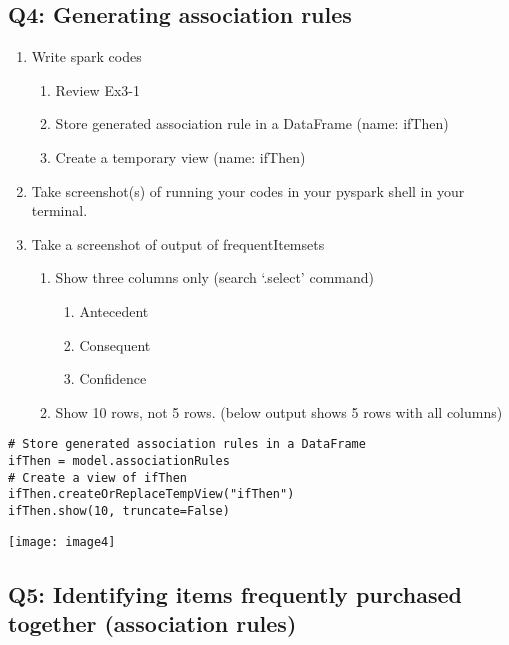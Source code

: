 \documentclass[]{article}
\begin{document}
\subsection*{Q4: Generating association rules}
\begin{enumerate}[before=\itshape,label=\arabic*.]
	\item Write spark codes
	\begin{enumerate}[before=\itshape,label=\alph*.]
		\item Review Ex3-1
		\item Store generated association rule in a DataFrame (name: ifThen)
		\item Create a temporary view (name: ifThen)
	\end{enumerate}
	\item Take screenshot(s) of running your codes in your pyspark shell in your terminal.
	\item Take a screenshot of output of frequentItemsets
	\begin{enumerate}[before=\itshape,label=\alph*.]
		\item Show three columns only (search ‘.select’ command)
		\begin{enumerate}[before=\itshape,label=\roman*.]
			\item Antecedent
			\item Consequent
			\item Confidence
		\end{enumerate}
		\item Show 10 rows, not 5 rows. (below output shows 5 rows with all columns)
	\end{enumerate}
\end{enumerate} 

\begin{verbatim}
# Store generated association rules in a DataFrame
ifThen = model.associationRules
# Create a view of ifThen
ifThen.createOrReplaceTempView("ifThen")
ifThen.show(10, truncate=False)
\end{verbatim}
\texttt{[image: image4]}

\subsection*{Q5: Identifying items frequently purchased together (association rules)}
\end{document}
